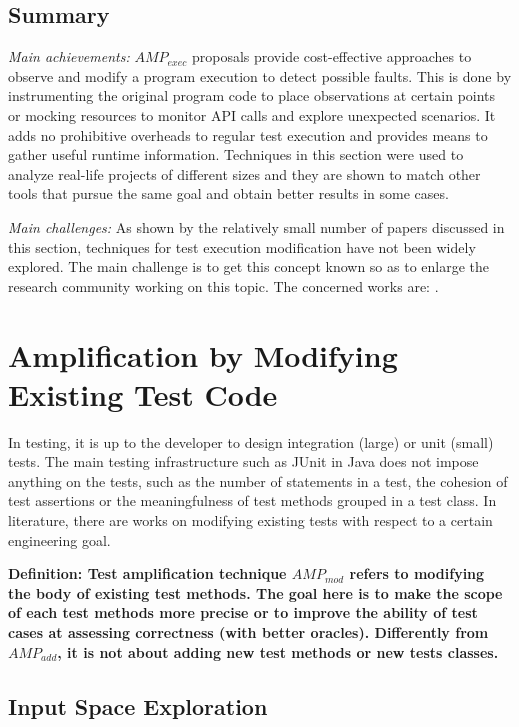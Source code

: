 \subsection{Summary}
\label{subsec:sota:category-3:summary}

\emph{Main achievements:} $AMP_{exec}$ proposals provide cost-effective approaches to observe and modify a program execution to detect possible faults.
This is done by instrumenting the original program code to place observations at certain points or mocking resources to monitor API calls and explore unexpected scenarios.
It adds no prohibitive overheads to regular test execution and provides means to gather useful runtime information. 
Techniques in this section were used to analyze real-life projects of different sizes and they are shown to match other tools that pursue the same goal and obtain better results in some cases. 

\emph{Main challenges:} 
As shown by the relatively small number of papers discussed in this section, techniques for test execution modification have not been widely explored. 
The main challenge is to get this concept known so as to enlarge the research community working on this topic.
The concerned works are: \cite{zhang2012,ZhangE14,cornu2015exception,leung12,fang2015perfblower,Zhang2016Isomorphic}.

\section{Amplification by Modifying Existing Test Code}
\label{sec:sota:category-4}

In testing, it is up to the developer to design integration (large) or unit (small) tests.
The main testing infrastructure such as JUnit in Java does not impose anything on the tests, such as the number of statements in a test, the cohesion of test assertions or the meaningfulness of test methods grouped in a test class. 
In literature, there are works on modifying existing tests with respect to a certain engineering goal.

\medskip
\textbf{Definition: Test amplification technique $AMP_{mod}$ refers to modifying the body of existing test methods. 
	The goal here is to make the scope of each test methods more precise or to improve the ability of test cases at assessing correctness (with better oracles). 
	Differently from $AMP_{add}$, it is not about adding new test methods or new tests classes.}

\subsection{Input Space Exploration}
\label{subsec:sota:category-4:input-exploration}

